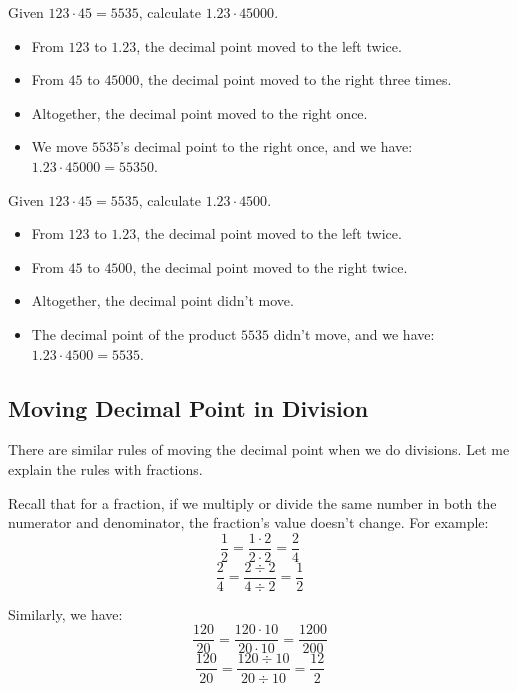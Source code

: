 \begin{myexample}
Given $123\cdot45=5535$, calculate $1.23\cdot45000$.
\end{myexample}
\begin{solution}
\begin{itemize}
\item From $123$ to $1.23$, the decimal point moved to the left twice.
\item From $45$ to $45000$, the decimal point moved to the right three times.
\item Altogether, the decimal point moved to the right once.
\item We move $5535$'s decimal point to the right once, and we have: $1.23\cdot45000=55350$.
\end{itemize}
\end{solution}

\begin{myexample}
Given $123\cdot45=5535$, calculate $1.23\cdot4500$.
\end{myexample}
\begin{solution}
\begin{itemize}
\item From $123$ to $1.23$, the decimal point moved to the left twice.
\item From $45$ to $4500$, the decimal point moved to the right twice.
\item Altogether, the decimal point didn't move.
\item The decimal point of the product $5535$ didn't move, and we have: $1.23\cdot4500=5535$.
\end{itemize}
\end{solution}

\subsection{Moving Decimal Point in Division}
There are similar rules of moving the decimal point when we do divisions. Let me explain the rules with fractions.

Recall that for a fraction, if we multiply or divide the same number in both the numerator and denominator, the fraction's value doesn't change. For example:
\[ \frac{1}{2}=\frac{1\cdot2}{2\cdot2}=\frac{2}{4} \]
\[ \frac{2}{4}=\frac{2\div2}{4\div2}=\frac{1}{2} \]

Similarly, we have:
\[ \frac{120}{20}=\frac{120\cdot10}{20\cdot10}=\frac{1200}{200} \]
\[ \frac{120}{20}=\frac{120\div10}{20\div10}=\frac{12}{2} \]

